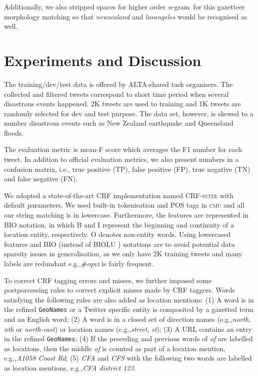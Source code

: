 \documentclass[11pt]{article}
\newcommand{\eg}{e.g.,\xspace}
\newcommand{\ie}{i.e.,\xspace}
\newcommand{\geoname}{\texttt{GeoNames}\xspace}
\newcommand{\myex}[1]{\textit{#1}}
\newcommand{\method}[1]{\textsf{#1}\xspace}
\newcommand{\ngram}{\textit{n}-gram\ }
\newcommand{\cmu}{\textsc{cmu}\xspace}
\newcommand{\crfsuite}{\textsc{CRF-suite}\xspace}
\begin{document}
Additionally, we also stripped spaces for higher order \ngram for this gazetteer morphology matching so that \myex{newzealand} and \myex{losangeles} would be recognised as well.

\section{Experiments and Discussion}
\label{sec:experiment}

The training/dev/test data is offered by ALTA-shared task organisers.
The collected and filtered tweets correspond to short time period when several disastrous events happened.
2K tweets are used to training and 1K tweets are randomly selected for dev and test purpose.
The data set, however, is skewed to a number disastrous events such as New Zealand earthquake and Queensland floods.

The evaluation metric is mean-F score which averages the F1 number for each tweet.
In addition to official evaluation metrics, we also present numbers in a confusion matrix, \ie true positive (TP), false positive (FP), true negative (TN) and false negative (FN).

We adopted a state-of-the-art CRF implementation named \crfsuite \cite{crfsuite} with default parameters.
We used built-in tokenisation and POS tags in \cmu and all our string matching is in lowercase.
Furthermore, the features are represented in \method{BIO} notation, in which \method{B} and \method{I} represent the beginning and continuity of a location entity, respectively.
\method{O} denotes non-entity words.
Using lowercased features and \method{BIO} (instead of \method{BIOLU} \cite{conll09rati}) notations are to avoid potential data sparsity issues in generalisation, as we only have 2K training tweets and many labels are redundant \eg \myex{\#eqnz} is fairly frequent.

To correct CRF tagging errors and misses, we further imposed some postporcessing rules to correct explicit misses made by CRF taggers.
Words satisfying the following rules are also added as location mentions:
(1) A word is in the refined \geoname or a Twitter specific entity is composited by a gazetted term and an English word;
(2) A word is in a closed set of direction names (\eg \myex{north}, \myex{nth} or \myex{north-east}) or location names (\eg \myex{street}, \myex{st});
(3) A URL contains an entry in the refined \geoname;
(4) If the preceding and previous words of \myex{of} are labelled as locations, then the middle \myex{of} is counted as part of a location mention, \eg \myex{A1058 Coast Rd};
(5) \myex{CFA} and \myex{CFS} with the following two words are labelled as location mentions, \eg \myex{CFA district 123}.
\end{document}
